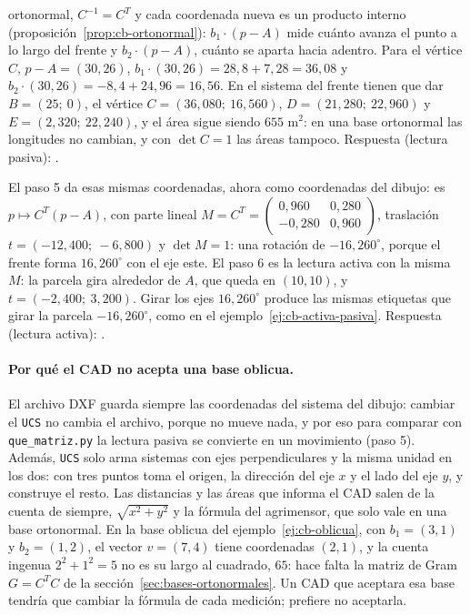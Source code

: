 ortonormal, \(C^{-1}=C^T\) y cada coordenada nueva es un producto interno
(proposición~\ref{prop:cb-ortonormal}): \(b_1\cdot(p-A)\) mide cuánto avanza el punto a lo
largo del frente y \(b_2\cdot(p-A)\), cuánto se aparta hacia adentro. Para el vértice \(C\),
\(p-A=(30,26)\), \(b_1\cdot(30,26)=28{,}8+7{,}28=36{,}08\) y
\(b_2\cdot(30,26)=-8{,}4+24{,}96=16{,}56\). En el sistema del frente tienen que dar
\(B=(25;\ 0)\), el vértice \(C=(36{,}080;\ 16{,}560)\), \(D=(21{,}280;\ 22{,}960)\) y
\(E=(2{,}320;\ 22{,}240)\), y el área sigue siendo \(655\) m\(^2\): en una base ortonormal las
longitudes no cambian, y con \(\det C=1\) las áreas tampoco. Respuesta (lectura pasiva):
.

El paso 5 da esas mismas coordenadas, ahora como coordenadas del dibujo: es
\(p\mapsto C^T(p-A)\), con parte lineal
\(M=C^T=\left(\begin{smallmatrix}0{,}960&0{,}280\\-0{,}280&0{,}960\end{smallmatrix}\right)\),
traslación \(t=(-12{,}400;\ -6{,}800)\) y \(\det M=1\): una rotación de \(-16{,}260^\circ\),
porque el frente forma \(16{,}260^\circ\) con el eje este. El paso 6 es la lectura activa con
la misma \(M\): la parcela gira alrededor de \(A\), que queda en \((10,10)\), y
\(t=(-2{,}400;\ 3{,}200)\). Girar los ejes \(16{,}260^\circ\) produce las mismas etiquetas que
girar la parcela \(-16{,}260^\circ\), como en el ejemplo~\ref{ej:cb-activa-pasiva}. Respuesta
(lectura activa): .

\paragraph{Por qué el CAD no acepta una base oblicua.} El archivo DXF guarda siempre las
coordenadas del sistema del dibujo: cambiar el \texttt{UCS} no cambia el archivo, porque no
mueve nada, y por eso para comparar con \texttt{que\_matriz.py} la lectura pasiva se convierte
en un movimiento (paso 5). Además, \texttt{UCS} solo arma sistemas con ejes perpendiculares y
la misma unidad en los dos: con tres puntos toma el origen, la dirección del eje \(x\) y el lado
del eje \(y\), y construye el resto. Las distancias y las áreas que informa el CAD salen de la
cuenta de siempre, \(\sqrt{x^2+y^2}\) y la fórmula del agrimensor, que solo vale en una base
ortonormal. En la base oblicua del ejemplo~\ref{ej:cb-oblicua}, con \(b_1=(3,1)\) y
\(b_2=(1,2)\), el vector \(v=(7,4)\) tiene coordenadas \((2,1)\), y la cuenta ingenua
\(2^2+1^2=5\) no es su largo al cuadrado, \(65\): hace falta la matriz de Gram
\(G=C^TC\) de la sección~\ref{sec:bases-ortonormales}. Un CAD que aceptara esa base tendría
que cambiar la fórmula de cada medición; prefiere no aceptarla.

